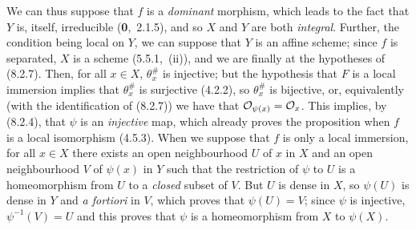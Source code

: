 \documentclass[../main.tex]{subfiles}
\begin{document}
We can thus suppose that $f$ is a \emph{dominant} morphism, which leads to the fact that $Y$ is, itself, irreducible (\textbf{0},~2.1.5), and so $X$ and $Y$ are both \emph{integral}.
Further, the condition being local on $Y$, we can suppose that $Y$ is an affine scheme; since $f$ is separated, $X$ is a scheme (5.5.1,~(ii)), and we are finally at the hypotheses of (8.2.7).
Then, for all $x\in X$, $\theta_x^\#$ is injective; but the hypothesis that $F$ is a local immersion implies that $\theta_x^\#$ is surjective (4.2.2), so $\theta_x^\#$ is bijective, or, equivalently (with the identification of (8.2.7)) we have that $\mathcal{O}_{\psi(x)}=\mathcal{O}_x$.
This implies, by (8.2.4), that $\psi$ is an \emph{injective} map, which already proves the proposition when $f$ is a local isomorphism (4.5.3).
When we suppose that $f$ is only a local immersion, for all $x\in X$ there exists an open neighbourhood $U$ of $x$ in $X$ and an open neighbourhood $V$ of $\psi(x)$ in $Y$ such that the restriction of $\psi$ to $U$ is a homeomorphism from $U$ to a \emph{closed} subset of $V$.
But $U$ is dense in $X$, so $\psi(U)$ is dense in $Y$ and \emph{a fortiori} in $V$, which proves that $\psi(U)=V$; since $\psi$ is injective, $\psi^{-1}(V)=U$ and this proves that $\psi$ is a homeomorphism from $X$ to $\psi(X)$.
\end{document}
